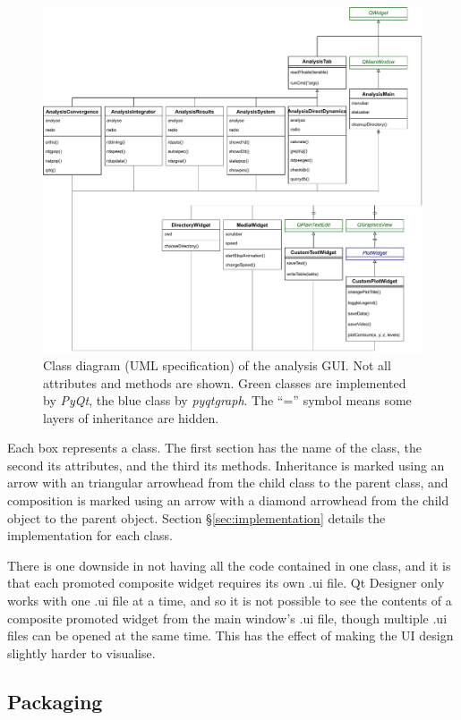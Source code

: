 \documentclass[12pt]{article}
\begin{document}
\begin{figure}[h]
    \centering
    \includegraphics[page=1, width=\textwidth]{img/uml.pdf}
    \caption{Class diagram (UML specification) of the analysis GUI. Not all attributes and methods are shown. Green classes are implemented by \textit{PyQt}, the blue class by \textit{pyqtgraph}. The ``='' symbol means some layers of inheritance are hidden.}
    \label{fig:class_diagram}
\end{figure}

Each box represents a class. The first section has the name of the class, the second its attributes, and the third its methods. Inheritance is marked using an arrow with an triangular arrowhead from the child class to the parent class, and composition is marked using an arrow with a diamond arrowhead from the child object to the parent object. Section \S\ref{sec:implementation} details the implementation for each class.

There is one downside in not having all the code contained in one class, and it is that each promoted composite widget requires its own .ui file. Qt Designer only works with one .ui file at a time, and so it is not possible to see the contents of a composite promoted widget from the main window's .ui file, though multiple .ui files can be opened at the same time. This has the effect of making the UI design slightly harder to visualise.

\subsection{Packaging}\label{ssec:packaging}
\end{document}
